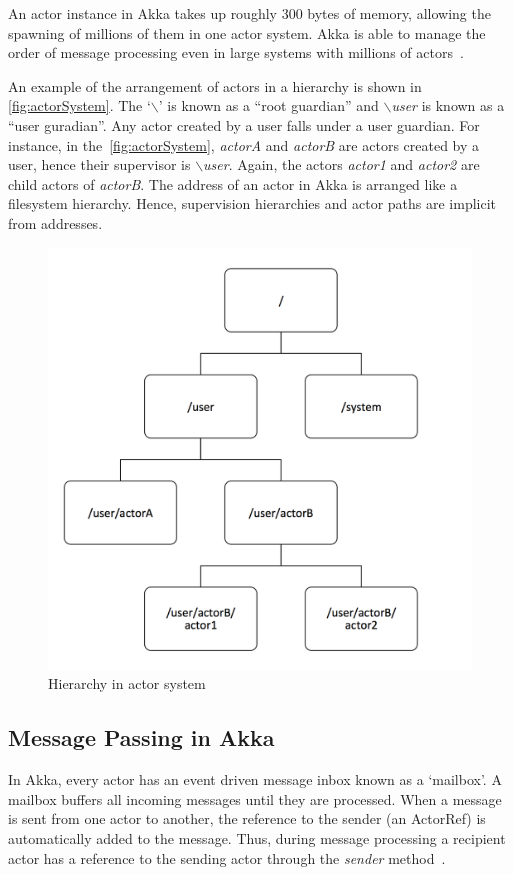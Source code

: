   An actor instance in Akka takes up roughly 300 bytes of memory, allowing the spawning of millions of them in one actor system. Akka is able to manage the order of message processing even in large systems with millions of actors~\cite{akkaJavaDoc}.

  An example of the arrangement of actors in a hierarchy is shown in \autoref{fig:actorSystem}. The ‘{$\backslash$}’ is known as a “root guardian” and \emph{$\backslash$user} is known as a “user guradian”. Any actor created by a user falls under a user guardian. For instance, in the~\autoref{fig:actorSystem}, \emph{actorA} and \emph{actorB} are actors created by a user, hence their supervisor is \emph{$\backslash$user}. Again, the actors \emph{actor1} and \emph{actor2} are child actors of \emph{actorB}. The address of an actor in Akka is arranged like a filesystem hierarchy. Hence, supervision hierarchies and actor paths are implicit from addresses.

\begin{figure}[H]
  \centering
  \includegraphics[scale=0.32]{figures/actorSystem}
  \caption[Hierarchy in actor system]{Hierarchy in actor system~\cite{akkaJavaDoc}}
  \label{fig:actorSystem}
\end{figure}

  \subsection{Message Passing in Akka}
  \label{subsec:akkaMessagePassing}
  In Akka, every actor has an event driven message inbox known as a ‘mailbox’. A mailbox buffers all incoming messages until they are processed. When a message is sent from one actor to another, the reference to the sender (an ActorRef) is automatically added to the message. Thus, during message processing a recipient actor has a reference to the sending actor through the \emph{sender} method~\cite{akkaJavaDoc}.

